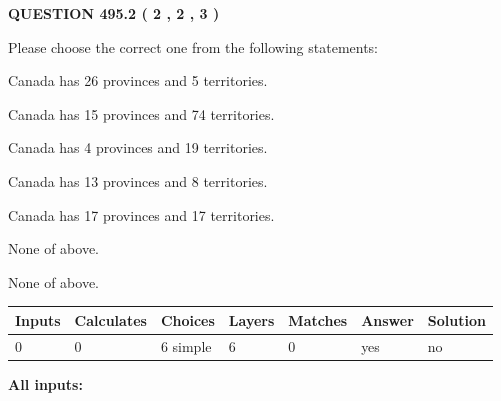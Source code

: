 \documentclass[12pt]{article}
\begin{document}
   
  
\vspace{0.2in}
  
{\textbf{\Large{QUESTION
495.2 
 ( 2 , 2 , 3 )
}}}
  
  
Please choose the correct one from the following statements:
 
 
Canada has  26 provinces and  5 territories.
 
 
Canada has  15 provinces and  74 territories.
 
 
Canada has   4 provinces and  19 territories.
 
 
Canada has  13 provinces and  8 territories.
 
 
Canada has  17 provinces and  17 territories.
 
 
 None of above.
 
 
\noindent{}
 
 
 None of above.
 
 
\noindent{}
 
 
   
   
   
   
\noindent\begin{tabular}{|l|l|l|l|l|l|l|}
 \hline
Inputs & Calculates & Choices & Layers & Matches & Answer & Solution \\ \hline
 0  & 
 0  & 
 6
  simple  
  & 
 6  & 
 0  & 
  yes & 
  no 
  \\ \hline
 \end{tabular}
   
   
   
   
\noindent{}
   
   
   
   
\noindent\vspace{0.1in}\hspace{-0.08in} {\textbf{\Large{All inputs: }}}
   
   
   
   
   
   
 \vspace{0.2in}
 
\end{document}
